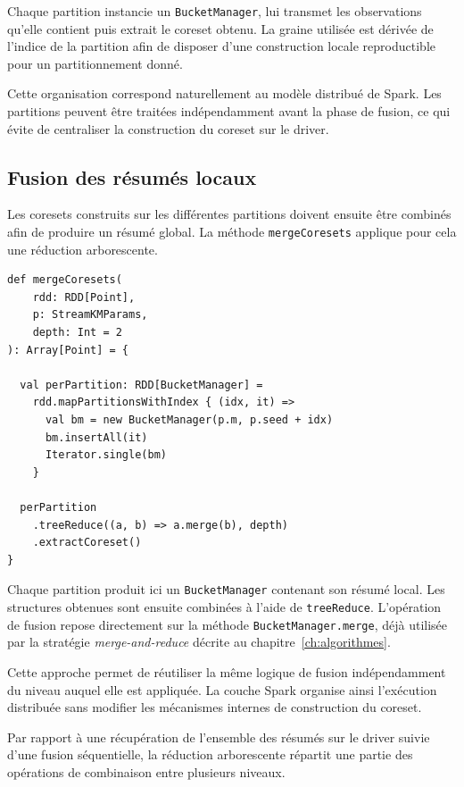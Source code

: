 Chaque partition instancie un \texttt{BucketManager}, lui transmet les observations qu'elle contient puis extrait le coreset obtenu. La graine utilisée est dérivée de l'indice de la partition afin de disposer d'une construction locale reproductible pour un partitionnement donné.

Cette organisation correspond naturellement au modèle distribué de Spark. Les partitions peuvent être traitées indépendamment avant la phase de fusion, ce qui évite de centraliser la construction du coreset sur le driver.

\subsection{Fusion des résumés locaux}

Les coresets construits sur les différentes partitions doivent ensuite être combinés afin de produire un résumé global. La méthode \texttt{mergeCoresets} applique pour cela une réduction arborescente.

\begin{verbatim}
def mergeCoresets(
    rdd: RDD[Point],
    p: StreamKMParams,
    depth: Int = 2
): Array[Point] = {

  val perPartition: RDD[BucketManager] =
    rdd.mapPartitionsWithIndex { (idx, it) =>
      val bm = new BucketManager(p.m, p.seed + idx)
      bm.insertAll(it)
      Iterator.single(bm)
    }

  perPartition
    .treeReduce((a, b) => a.merge(b), depth)
    .extractCoreset()
}
\end{verbatim}

Chaque partition produit ici un \texttt{BucketManager} contenant son résumé local. Les structures obtenues sont ensuite combinées à l'aide de \texttt{treeReduce}. L'opération de fusion repose directement sur la méthode \texttt{BucketManager.merge}, déjà utilisée par la stratégie \emph{merge-and-reduce} décrite au chapitre~\ref{ch:algorithmes}.

Cette approche permet de réutiliser la même logique de fusion indépendamment du niveau auquel elle est appliquée. La couche Spark organise ainsi l'exécution distribuée sans modifier les mécanismes internes de construction du coreset.

Par rapport à une récupération de l'ensemble des résumés sur le driver suivie d'une fusion séquentielle, la réduction arborescente répartit une partie des opérations de combinaison entre plusieurs niveaux.

